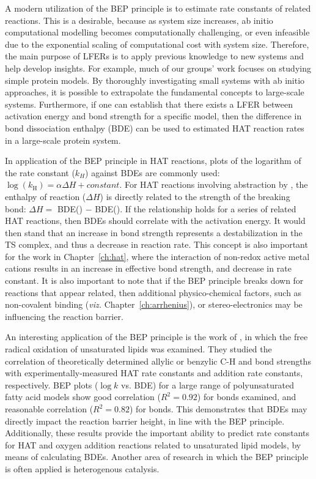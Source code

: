 A modern utilization of the BEP principle is to estimate rate constants of
related reactions. This is a desirable, because as system size increases, ab
initio computational modelling becomes computationally challenging, or even
infeasible due to the exponential scaling of computational cost with system
size. Therefore, the main purpose of LFERs is to apply previous knowledge to
new systems and help develop insights. For example, much of our groups' work
focuses on studying simple protein models. By thoroughly investigating small
systems with ab initio approaches, it is possible to extrapolate the
fundamental concepts to large-scale systems. Furthermore, if one can establish
that there exists a LFER between activation energy and bond strength for a
specific model, then the difference in bond dissociation enthalpy (BDE) can be
used to estimated HAT reaction rates in a large-scale protein system.

In application of the BEP principle in HAT reactions, plots of the logarithm of
the rate constant ($k_H$) against BDEs are commonly used: $\log(k_\mathrm{H}) =
\alpha \Delta H + constant$. For HAT reactions involving abstraction by \cumo,
the enthalpy of reaction ($\Delta H$) is directly related to the strength of
the breaking bond: $\Delta H =$ BDE() $-$ BDE(). If the
relationship holds for a series of related HAT reactions, then BDEs should
correlate with the activation energy. It would then stand that an increase in
bond strength represents a destabilization in the TS complex, and thus a
decrease in reaction rate. This concept is also important for the work in
Chapter~\ref{ch:hat}, where the interaction of non-redox active metal cations
results in an increase in effective bond strength, and decrease in rate
constant. It is also important to note that if the BEP principle breaks down
for reactions that appear related, then additional physico-chemical factors,
such as non-covalent binding (\emph{viz.} Chapter~\ref{ch:arrhenius}), or
stereo-electronics may be influencing the reaction barrier.

An interesting application of the BEP principle is the work of
\citet{Pratt2003}, in which the free radical oxidation of unsaturated lipids
was examined. They studied the correlation of theoretically determined allylic
or benzylic C-H and  bond strengths with experimentally-measured HAT
rate constants and  addition rate constants, respectively. BEP plots
($\log k$ vs. BDE) for a large range of polyunsaturated fatty acid models show
good correlation ($R^2 = 0.92$) for  bonds examined, and reasonable
correlation ($R^2 = 0.82$) for  bonds. This demonstrates that BDEs may
directly impact the reaction barrier height, in line with the BEP principle.
Additionally, these results provide the important ability to predict rate
constants for HAT and oxygen addition reactions related to unsaturated lipid
models, by means of calculating BDEs. Another area of research in which the BEP
principle is often applied is heterogenous catalysis.\cite{Panov2015}

